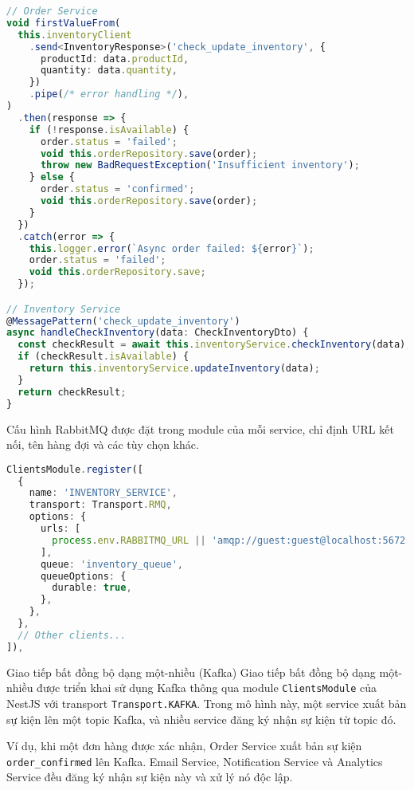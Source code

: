 \begin{lstlisting}[language=Typescript]
// Order Service
void firstValueFrom(
  this.inventoryClient
    .send<InventoryResponse>('check_update_inventory', {
      productId: data.productId,
      quantity: data.quantity,
    })
    .pipe(/* error handling */),
)
  .then(response => {
    if (!response.isAvailable) {
      order.status = 'failed';
      void this.orderRepository.save(order);
      throw new BadRequestException('Insufficient inventory');
    } else {
      order.status = 'confirmed';
      void this.orderRepository.save(order);
    }
  })
  .catch(error => {
    this.logger.error(`Async order failed: ${error}`);
    order.status = 'failed';
    void this.orderRepository.save;
  });

// Inventory Service
@MessagePattern('check_update_inventory')
async handleCheckInventory(data: CheckInventoryDto) {
  const checkResult = await this.inventoryService.checkInventory(data);
  if (checkResult.isAvailable) {
    return this.inventoryService.updateInventory(data);
  }
  return checkResult;
}
\end{lstlisting}

Cấu hình RabbitMQ được đặt trong module của mỗi service, chỉ định URL kết nối, tên hàng đợi và các tùy chọn khác.

\begin{lstlisting}[language=Typescript]
ClientsModule.register([
  {
    name: 'INVENTORY_SERVICE',
    transport: Transport.RMQ,
    options: {
      urls: [
        process.env.RABBITMQ_URL || 'amqp://guest:guest@localhost:5672',
      ],
      queue: 'inventory_queue',
      queueOptions: {
        durable: true,
      },
    },
  },
  // Other clients...
]),
\end{lstlisting}

Giao tiếp bất đồng bộ dạng một-nhiều (Kafka)
Giao tiếp bất đồng bộ dạng một-nhiều được triển khai sử dụng Kafka thông qua module \texttt{ClientsModule} của NestJS với transport \texttt{Transport.KAFKA}. Trong mô hình này, một service xuất bản sự kiện lên một topic Kafka, và nhiều service đăng ký nhận sự kiện từ topic đó.

Ví dụ, khi một đơn hàng được xác nhận, Order Service xuất bản sự kiện \texttt{order\_confirmed} lên Kafka. Email Service, Notification Service và Analytics Service đều đăng ký nhận sự kiện này và xử lý nó độc lập.

